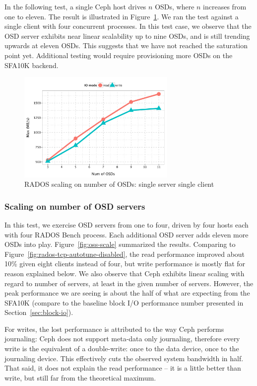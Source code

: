 In the following test, a single Ceph host drives $n$ OSDs, where $n$ increases
from one to eleven. The result is illustrated in Figure~\ref{fig:osd-scale}.
We ran the test against a single client with four concurrent processes. In this
test case, we observe that the OSD server exhibits near linear scalability up to
nine OSDs, and is still trending upwards at eleven OSDs. This suggests that we
have not reached the saturation point yet. Additional testing would require
provisioning more OSDs on the SFA10K backend.


\begin{figure}[htb]
\centering
\includegraphics[width=3in]{data/rados_osd}
\caption{RADOS scaling on number of OSDs: single server single client}
\label{fig:osd-scale}
\end{figure}

\subsubsection{Scaling on number of OSD servers}

In this test, we exercise OSD servers from one to four, driven by four hosts
each with four RADOS Bench process. Each additional OSD server adds eleven
more OSDs into play.  Figure~\ref{fig:oss-scale} summarized the results.
Comparing to Figure~\ref{fig:rados-tcp-autotune-disabled}, the read
performance improved about 10\% given eight clients instead of four, but write
performance is mostly flat for reason explained below. We also observe that
Ceph exhibits linear scaling with regard to number of servers, at least in the
given number of servers.  However, the peak performance we are seeing is about
the half of what are expecting from the SFA10K (compare to the baseline block
I/O performance number presented in Section~\ref{sec:block-io}).

For writes, the lost performance is attributed to the way Ceph performs
journaling: Ceph does not support meta-data only journaling, therefore every
write is the equivalent of a double-write: once to the data device, once to
the journaling device. This effectively cuts the observed system bandwidth in
half. That said, it does not explain the read performance -- it is a little
better than write, but still far from the theoretical maximum.


